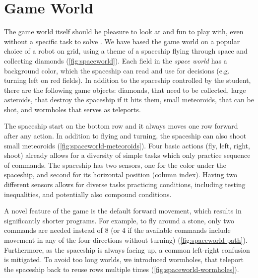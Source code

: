 

\section{Game World}  %
\label{sec:robomission.game-world}

The game world itself should be pleasure to look at and fun to play with,
even without a specific task to solve \cite{book-of-lenses}.
We have based the game world on a popular choice of a robot on grid,
using a theme of a spaceship flying through space and collecting diamonds
(\cref{fig:spaceworld}).
Each field in the \emph{space world} has a background color, which
the spaceship can read and use for decisions (e.g. turning left on red fields).
In addition to the spaceship controlled by the student,
there are the following game objects:
diamonds, that need to be collected,
large asteroids, that destroy the spaceship if it hits them,
small meteoroids, that can be shot,
and wormholes that serves as teleports.

The spaceship start on the bottom row and it always moves one row forward
after any action. %
In addition to flying and turning, the spaceship can also shoot small meteoroids
(\cref{fig:spaceworld-meteoroids}).
Four basic actions (fly, left, right, shoot) already allows for a
diversity of simple tasks which only practice sequence of commands.
The spaceship has two sensors, one for the color under the spaceship, and
second for its horizontal position (column index). Having two different sensors allows
for diverse tasks practicing conditions, including testing inequalities, and
potentially also compound conditions.

A novel feature of the game is the default forward movement,
which results in significantly shorter programs.
For example, to fly around a stone, only two commands are needed %
instead of 8 (or 4 if the available commands include
movement in any of the four directions without turning)
(\cref{fig:spaceworld-path}).
Furthermore, as the spaceship is always facing up, a common left-right
confusion \cite{blockly-10-things} is mitigated.
To avoid too long worlds, we introduced wormholes, that teleport the
spaceship back to reuse rows multiple times
(\cref{fig:spaceworld-wormholes}).



